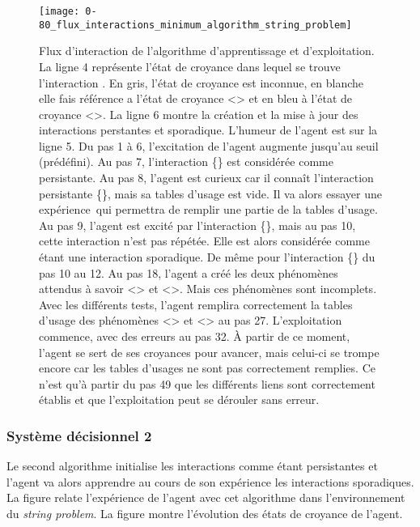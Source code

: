 \documentclass{llncs}
\begin{document}
\begin{figure}
	\centering
	\texttt{[image: 0-80\_flux\_interactions\_minimum\_algorithm\_string\_problem]}
	\caption{Flux d'interaction de l'algorithme d'apprentissage et d'exploitation. La ligne \num{4} représente l'état de croyance dans lequel se trouve l'interaction \enacted. En gris, l'état de croyance est inconnue, en blanche elle fais référence a l'état de croyance <\carreBlanc> et en bleu à l'état de croyance <\carreBleu>. 
		La ligne \num{6} montre la création et la mise à jour des interactions perstantes et sporadique. 		
		L'humeur de l'agent est sur la ligne \num{5}. Du pas 1 à 6, l'excitation de l'agent augmente jusqu'au seuil (prédéfini). Au pas 7, l'interaction \{\carreBlanc\} est considérée comme persistante. Au pas 8, l'agent est curieux car il connaît l'interaction persistante \{\carreBlanc\}, mais sa tables d'usage est vide. Il va alors essayer une expérience\protect\footnotemark~qui permettra de remplir une partie de la tables d'usage. Au pas 9, l'agent est excité par l'interaction \enacted \{\triangleBlanc\}, mais au pas 10, cette interaction n'est pas répétée. Elle est alors considérée comme étant une interaction sporadique. De même pour l'interaction \{\triangleBleu\} du pas 10 au 12. Au pas 18, l'agent a créé les deux phénomènes attendus à savoir <\carreBlanc> et <\carreBleu>. Mais ces phénomènes sont incomplets. Avec les différents tests, l'agent remplira correctement la tables d'usage des phénomènes <\carreBlanc> et <\carreBleu> au pas 27. L'exploitation commence, avec des erreurs au pas 32. À partir de ce moment, l'agent se sert de ses croyances pour avancer, mais celui-ci se trompe encore car les tables d'usages ne sont pas correctement remplies. Ce n'est qu'à partir du pas 49 que les différents liens sont correctement établis et que l'exploitation peut se dérouler sans erreur.}
	\label{fig:flux_interactions_minimum_algorithm_string_problem}
\end{figure}

\newpage

\subsubsection{Système décisionnel \num{2}}
Le second algorithme %
initialise les interactions comme étant
 persistantes et l'agent va alors apprendre au cours de son expérience les interactions sporadiques. La figure  relate l'expérience de l'agent avec cet algorithme dans l'environnement du \emph{string problem}. La figure  montre l'évolution des états de croyance de l'agent.
\end{document}
